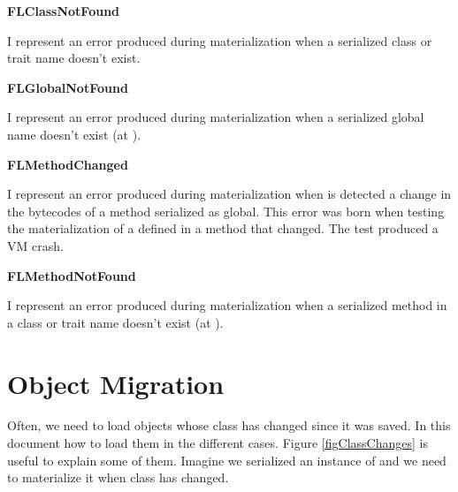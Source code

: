 \documentclass[a4paper,10pt,twoside]{book}
\begin{document}
\begin{list}{}{}
\item\hspace{-\labelwidth}\textbf{ FLClassNotFound}
\item  I represent an error produced during materialization when a serialized class or trait name doesn't exist.
\end{list}

\begin{list}{}{}
\item\hspace{-\labelwidth}\textbf{ FLGlobalNotFound}
\item  I represent an error produced during materialization when a serialized global name doesn't exist (at ).
\end{list}

\begin{list}{}{}
\item\hspace{-\labelwidth}\textbf{ FLMethodChanged}
\item  I represent an error produced during materialization when is detected a change in the bytecodes of a method serialized as global. This error was born when testing the materialization of a  defined in a method that changed. The test produced a VM crash.
\end{list}

\begin{list}{}{}
\item\hspace{-\labelwidth}\textbf{ FLMethodNotFound}
\item  I represent an error produced during materialization when a serialized method in a class or trait name doesn't exist (at ).
\end{list}



\section{Object Migration}

Often, we need to load objects whose class has changed since it was saved. In this document how to load them in the different cases. Figure \ref{figClassChanges} is useful to explain some of them. Imagine we serialized an instance of  and we need to materialize it when  class has changed.
\end{document}
